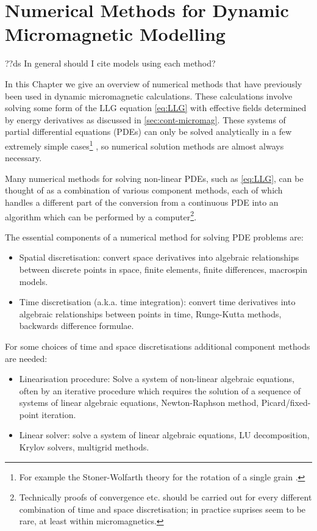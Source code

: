 \chapter{Numerical Methods for Dynamic Micromagnetic Modelling}
\label{sec:numer-meth-micr}

??ds In general should I cite models using each method?


In this Chapter we give an overview of numerical methods that have previously been used in dynamic micromagnetic calculations.
These calculations involve solving some form of the LLG equation \cref{eq:LLG} with effective fields determined by energy derivatives as discussed in \cref{sec:cont-micromag}.
These systems of partial differential equations (PDEs) can only be solved analytically in a few extremely simple cases\footnote{For example the Stoner-Wolfarth theory for the rotation of a single grain \cite{Stoner1948a}.} \cite{Aharoni1996}, so numerical solution methods are almost always necessary.

Many numerical methods for solving non-linear PDEs, such as \cref{eq:LLG}, can be thought of as a combination of various component methods, each of which handles a different part of the conversion from a continuous PDE into an algorithm which can be performed by a computer\footnote{Technically proofs of convergence etc. should be carried out for every different combination of time and space discretisation\cite[382]{Iserles2009}; in practice suprises seem to be rare, at least within micromagnetics.}.

The essential components of a numerical method for solving PDE problems are:
\begin{itemize}
\item Spatial discretisation: convert space derivatives into algebraic relationships between discrete points in space, \eg finite elements, finite differences, macrospin models. 
\item Time discretisation (a.k.a. time integration):  convert time derivatives into algebraic relationships between points in time, \eg Runge-Kutta methods, backwards difference formulae.
\end{itemize}
For some choices of time and space discretisations additional component methods are needed:
\begin{itemize}
\item Linearisation procedure: Solve a system of non-linear algebraic equations, often by an iterative procedure which requires the solution of a sequence of systems of linear algebraic equations, \eg Newton-Raphson method, Picard/fixed-point iteration. 
\item Linear solver: solve a system of linear algebraic equations, \eg LU decomposition, Krylov solvers, multigrid methods. 
\end{itemize}

